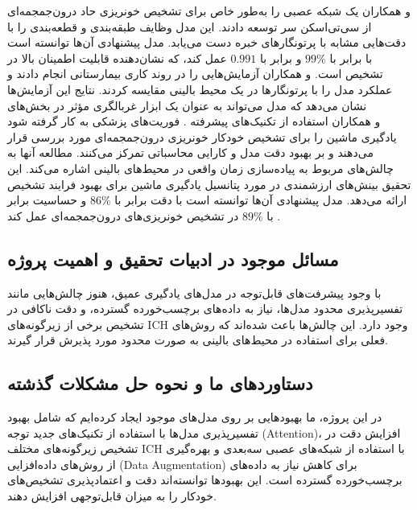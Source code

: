  و همکاران یک شبکه عصبی 
  را به‌طور خاص برای تشخیص خونریزی حاد درون‌جمجمه‌ای از سی‌تی‌اسکن سر توسعه دادند. این مدل وظایف طبقه‌بندی و قطعه‌بندی را با دقت‌هایی مشابه با پرتونگار‌های خبره دست می‌یابد. مدل پیشنهادی آن‌ها توانسته است با  
  برابر با 
 \(99\%\)
 و
 برابر با 
 \(0.991\)
 عمل کند، که نشان‌دهنده قابلیت اطمینان بالا در تشخیص است. 
  و همکاران آزمایش‌هایی را در روند کاری بیمارستانی انجام دادند و عملکرد مدل را با پرتونگار‌ها در یک محیط بالینی مقایسه کردند. نتایج این آزمایش‌ها نشان می‌دهد که مدل می‌تواند به عنوان یک ابزار غربالگری مؤثر در بخش‌های فوریت‌های پزشکی به کار گرفته شود‎\cite{kuo2019expert}
.
و همکاران استفاده از تکنیک‌های پیشرفته یادگیری ماشین را برای تشخیص خودکار خونریزی درون‌جمجمه‌ای مورد بررسی قرار می‌دهند و بر بهبود دقت مدل و کارایی محاسباتی تمرکز می‌کنند. مطالعه آنها به چالش‌های مربوط به پیاده‌سازی زمان واقعی
 در محیط‌های بالینی اشاره می‌کند. این تحقیق بینش‌های ارزشمندی در مورد پتانسیل یادگیری ماشین برای بهبود فرایند تشخیص ارائه می‌دهد. مدل پیشنهادی آن‌ها توانسته است با دقت 
  برابر با 
 \(86\%\)
 و حساسیت 
  برابر با 
 \(89\%\)
 در تشخیص خونریزی‌های درون‌جمجمه‌ای عمل کند
\cite{arbabshirani2018advanced}.



\subsection*{مسائل موجود در ادبیات تحقیق و اهمیت پروژه}




با وجود پیشرفت‌های قابل‌توجه در مدل‌های یادگیری عمیق، هنوز چالش‌هایی مانند تفسیرپذیری محدود مدل‌ها، نیاز به داده‌های برچسب‌خورده گسترده، و دقت ناکافی در تشخیص برخی از زیرگونه‌های ICH وجود دارد. این چالش‌ها باعث شده‌اند که روش‌های فعلی برای استفاده در محیط‌های بالینی به صورت محدود مورد پذیرش قرار گیرند.

\subsection*{دستاوردهای ما و نحوه حل مشکلات گذشته}

در این پروژه، ما بهبودهایی بر روی مدل‌های موجود ایجاد کرده‌ایم که شامل بهبود تفسیرپذیری مدل‌ها با استفاده از تکنیک‌های جدید توجه (Attention)، افزایش دقت در تشخیص زیرگونه‌های مختلف ICH با استفاده از شبکه‌های عصبی سه‌بعدی و بهره‌گیری از روش‌های داده‌افزایی (Data Augmentation) برای کاهش نیاز به داده‌های برچسب‌خورده گسترده است. این بهبودها توانسته‌اند دقت و اعتمادپذیری تشخیص‌های خودکار را به میزان قابل‌توجهی افزایش دهند.
